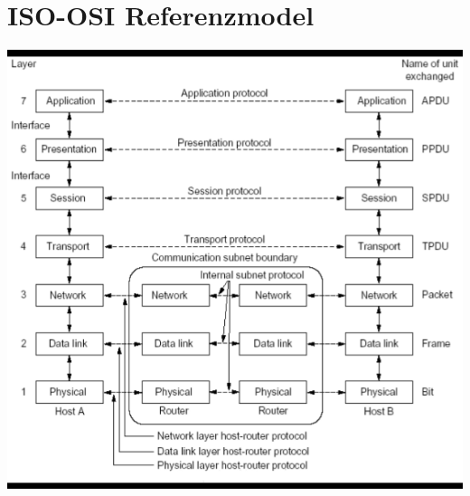 \documentclass[11pt]{article}
\begin{document}
\section{ISO-OSI Referenzmodel}

    \includegraphics[width=\textwidth]{ISO_OSIReferenceModel.png}
\end{document}
